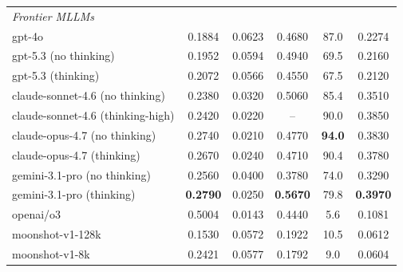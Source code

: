 \begin{table}[t]
\begin{tabular}{l c c c c c}
  \midrule                                                                                                                                            
  \multicolumn{6}{l}{\textit{Frontier MLLMs}} \\                                                                                                      
  gpt-4o                              & 0.1884          & 0.0623          & 0.4680          & 87.0          & 0.2274 \\                               
  gpt-5.3 (no thinking)               & 0.1952          & 0.0594          & 0.4940          & 69.5          & 0.2160 \\                               
  gpt-5.3 (thinking)                  & 0.2072          & 0.0566          & 0.4550          & 67.5          & 0.2120 \\                               
  claude-sonnet-4.6 (no thinking)     & 0.2380          & 0.0320          & 0.5060          & 85.4          & 0.3510 \\                               
  claude-sonnet-4.6 (thinking-high)   & 0.2420          & 0.0220          & --              & 90.0          & 0.3850 \\                               
  claude-opus-4.7 (no thinking)       & 0.2740          & 0.0210          & 0.4770          & \textbf{94.0} & 0.3830 \\                               
  claude-opus-4.7 (thinking)          & 0.2670          & 0.0240          & 0.4710          & 90.4          & 0.3780 \\                               
  gemini-3.1-pro (no thinking)        & 0.2560          & 0.0400          & 0.3780          & 74.0          & 0.3290 \\                               
  gemini-3.1-pro (thinking)           & \textbf{0.2790} & 0.0250          & \textbf{0.5670} & 79.8          & \textbf{0.3970} \\                      
  openai/o3                           & 0.5004          & 0.0143          & 0.4440          & 5.6           & 0.1081 \\                               
  moonshot-v1-128k                    & 0.1530          & 0.0572          & 0.1922          & 10.5          & 0.0612 \\                               
  moonshot-v1-8k                      & 0.2421          & 0.0577          & 0.1792          & 9.0           & 0.0604 \\                               

\end{tabular}
\end{table}
